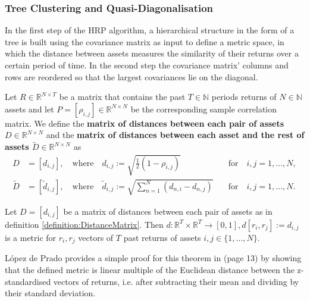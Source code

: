     \subsubsection{Tree Clustering and Quasi-Diagonalisation}
        In the first step of the HRP algorithm, a hierarchical structure in the form of a tree is built using the covariance matrix as input to define a metric space, in which the distance between assets measures the similarity of their returns over a certain period of time. In the second step the covariance matrix' columns and rows are reordered so that the largest covariances lie on the diagonal.
        
        \begin{definition}\label{definition:DistanceMatrix}
            Let $R \in \mathbb{R}^{N \times T}$ be a matrix that contains the past $T \in \mathbb{N}$ periods returns of $N \in \mathbb{N}$ assets and let $P = [\rho_{i,j}] \in \mathbb{R}^{N \times N}$ be the corresponding sample correlation matrix. We define the \textbf{matrix of distances between each pair of assets $D \in \mathbb{R}^{N \times N}$} and the \textbf{matrix of distances between each asset and the rest of assets $\tilde{D} \in \mathbb{R}^{N \times N}$} as
            \begin{align*}
                D &= [d_{i,j}], \quad \text{where} \quad d_{i,j} := \sqrt{\frac{1}{2} \left( 1 - \rho_{i,j} \right)} &\quad \text{for} \quad i,j = 1, \dots, N, \\
                \tilde{D} &=  [\tilde{d}_{i,j}], \quad \text{where} \quad \tilde{d}_{i,j} := \sqrt{\sum_{n=1}^N \left( d_{n,i} - d_{n,j} \right)} &\quad \text{for} \quad i,j = 1, \dots, N.
            \end{align*}
        \end{definition}
        
        \begin{theorem}
            Let $D = [d_{i,j}]$ be a matrix of distances between each pair of assets as in definition \ref{definition:DistanceMatrix}. Then $d: \mathbb{R}^T \times \mathbb{R}^T \rightarrow [0,1], d[r_i, r_j] := d_{i,j}$ is a metric for $r_i, r_j$ vectors of $T$ past returns of assets $i,j \in \{ 1, \dots, N \}$.
        \end{theorem}
        
        López de Prado provides a simple proof for this theorem in \cite{lopezmain} (page 13) by showing that the defined metric is linear multiple of the Euclidean distance between the z-standardised vectors of returns, i.e. after subtracting their mean and dividing by their standard deviation.
        
